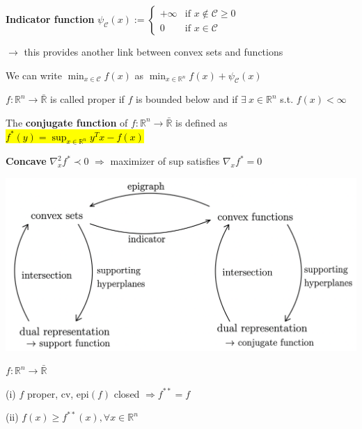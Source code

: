 \textbf{Indicator function}
$\psi_\mathcal{C}(x) := \begin{cases} +\infty &\text{if } x \notin\mathcal{C} \ge 0 \\ 0 &\text{if } x \in\mathcal{C} \end{cases}$

$\rightarrow$ this provides another link between convex sets and functions

We can write
$\min_{x \in \mathcal{C}}f(x)$ as
$\min_{x \in \mathbb{R}^{n}}f(x) + \psi_\mathcal{C}(x)$

\begin{definition}[3]
	$f: \mathbb{R}^{n}\rightarrow\bar{\mathbb{R}}$ is called proper
	if $f$ is bounded below and
	if $\exists\ x \in \mathbb{R}^{n}$ s.t. $f(x)<\infty$
\end{definition}

\begin{definition}
	The \textbf{conjugate function} of $f: \mathbb{R}^{n}\rightarrow\bar{\mathbb{R}}$  is defined as
	\textcolor{hltext}{\hl{ $f^*(y)=\sup_{x \in \mathbb{R}^{n}}y^T x-f(x)$ }}
\end{definition}

\textbf{Concave}
$\nabla_x^2 f^* \prec0$
$\Rightarrow$
maximizer of sup satisfies
$\nabla_x f^* = 0$

\includegraphics[width=\columnwidth]{images/summary_set_functions.png}

\begin{theorem}
	$f:\mathbb{R}^{n}\rightarrow\bar{\mathbb{R}}$

	(i) $f$ proper, cv, epi$(f)$ closed
	$\Rightarrow f^{**}=f$

	(ii) $f(x)\ge f^{**}(x), \forall x\in\mathbb{R}^{n}$
\end{theorem}

